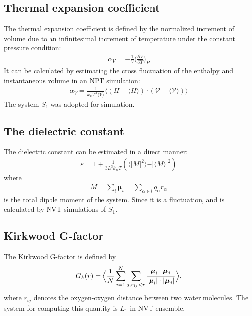 \documentclass[a4paper,preprint,unsortedaddress,onecolumn,fleqn]{revtex4}
\newcommand{\systemsb}{S_1}
\begin{document}
\subsection{Thermal expansion coefficient}

The thermal expansion coefficient is defined by the normalized increment of
volume due to an infinitesimal increment of temperature under the constant
pressure condition: 
\begin{align}
\alpha_V = - \frac 1V \Big(\frac{\partial V}{\partial T}\Big)_P
\end{align}
It can be calculated by estimating the cross fluctuation of the enthalpy and
instantaneous volume in an NPT simulation: 
\begin{align}
\alpha_V = \frac{1}{k_BT^2\langle \mathcal{V}\rangle} \langle (H - \langle
H\rangle)\cdot(\mathcal{V }- \langle \mathcal{V}\rangle) \rangle
\end{align}
The system $S_1$ was adopted for simulation.

\subsection{The dielectric constant}

The dielectric constant can be estimated in a direct manner: 
\begin{align}
\varepsilon = 1 + \frac{1}{3L^3 k_BT} ( \langle \vert \mathbf{\mathit{M}}%
\vert^2\rangle - \vert\langle \mathbf{\mathit{M}}\rangle\vert^2 )
\end{align}
where 
\begin{align}
\mathbf{\mathit{M }} = \sum_i\boldsymbol{\mu}_i = \sum_{\alpha\in i} q_\alpha%
\mathbf{\mathit{r}}_\alpha
\end{align}
is the total dipole moment of the system. Since it is a fluctuation, and is
calculated by NVT simulations of $S_1$. 

\subsection{Kirkwood G-factor}

The Kirkwood G-factor is defined by~\cite{vanderSpoel2006origin} 
\begin{align}
G_k(r) = \Big\langle \frac 1N \sum_{i=1}^N \sum_{j, r_{ij} < r} \frac {%
\boldsymbol{\mu}_i \cdot \boldsymbol{\mu}_j}{\vert \boldsymbol{\mu}_i\vert
\cdot \vert\boldsymbol{\mu}_j\vert} \Big\rangle,
\end{align}
where $r_{ij}$ denotes the oxygen-oxygen distance between two water
molecules. The system for computing this quantity is $L_1$ in NVT ensemble.
\end{document}
